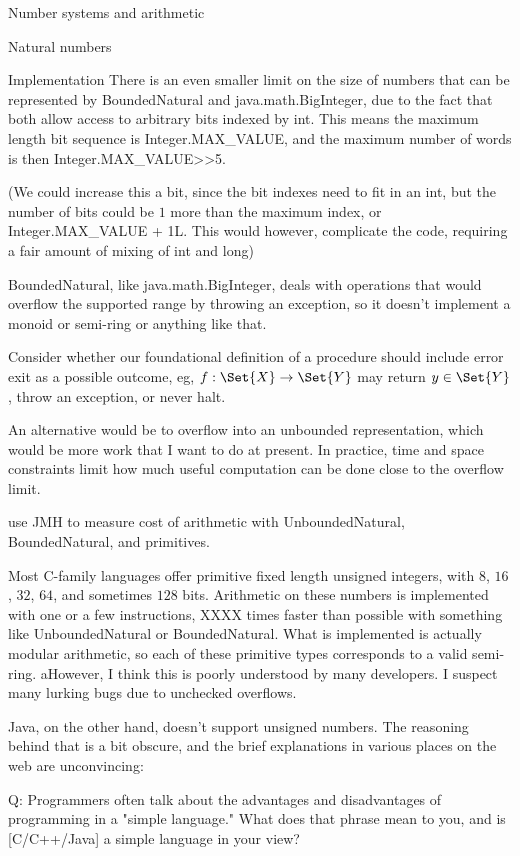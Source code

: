 \documentclass[12pt]{PalisadesLakesBook}
\begin{document}
\begin{plSection}{Number systems and arithmetic}
\begin{plSection}{Natural numbers}
\begin{plSection}{Implementation}
There is an even smaller limit on the size of numbers that can be
represented by {\javaFont BoundedNatural} and 
{\javaFont java.math.BigInteger},
due to the fact that both allow access to arbitrary bits
indexed by {\javaFont int}.
This means the maximum length bit sequence is 
{\javaFont Integer.MAX\_VALUE},
and the maximum number of words is then
{\javaFont Integer.MAX\_VALUE>>5}.

(We could increase this a bit, since the bit indexes need to fit
in an {\javaFont int}, but the number of bits could be $1$ more
than the maximum index, or {\javaFont Integer.MAX\_VALUE + 1L}.
This would however, complicate the code, requiring a fair amount
of mixing of {\javaFont int} and {\javaFont long})

{\javaFont BoundedNatural}, like {\javaFont java.math.BigInteger},
deals with operations that would overflow the supported range
by throwing an exception, 
so it doesn't implement a monoid or semi-ring 
or anything like that.

\TODO Consider whether our foundational definition of a procedure
should include error exit as a possible outcome, eg,
$ f : \Set{X} \rightarrow \Set{Y}$ may
return $y\in \Set{Y}$, throw an exception,
or never halt.

An alternative would be to overflow into an unbounded 
representation, which would be more work that I want to do 
at present.
In practice, time and space constraints limit how much useful
computation can be done close to the overflow limit.

\TODO use JMH to measure cost of arithmetic with
{\javaFont UnboundedNatural},
{\javaFont BoundedNatural},
and primitives.

Most C-family languages offer primitive fixed length
unsigned integers, with $8$, $16$, $32$, $64$, and 
sometimes $128$ bits.
Arithmetic on these numbers is implemented with one or a few
instructions, XXXX times faster than possible with something
like {\javaFont UnboundedNatural} or
{\javaFont BoundedNatural}.
What is implemented is actually modular arithmetic,
so each of these primitive types corresponds to a valid
semi-ring.
aHowever, I think this is poorly understood by many developers.
I suspect many lurking bugs due to unchecked overflows.

Java, on the other hand, doesn't support unsigned numbers.
The reasoning behind that is a bit obscure,
and the brief explanations in various places on the web
are unconvincing:

\begin{plQuote}
{}{}%
{%
Q: Programmers often talk about the advantages and disadvantages 
of programming in a "simple language."  
What does that phrase mean to you, and is [C/C++/Java] 
a simple language in your view? 

}
\end{plQuote}
\end{plSection}
\end{plSection}
\end{plSection}
\end{document}
